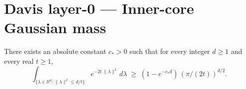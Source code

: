 
\chapter{Davis layer-0 — Inner-core Gaussian mass}
\label{chap:davis-l0-innercore}

\begin{lemma}
\label{lem:inner-core}
There exists an absolute constant $c_* > 0$ such that for every integer
$d \ge 1$ and every real $t \ge 1$,
\[
  \int_{\{\lambda \in \mathbb{R}^d : \|\lambda\|^2 \le d/t\}} e^{-2t\,\|\lambda\|^2}\,d\lambda
  \;\ge\; (1 - e^{-c_* d})\,(\pi/(2t))^{d/2}.
\]
\end{lemma}

